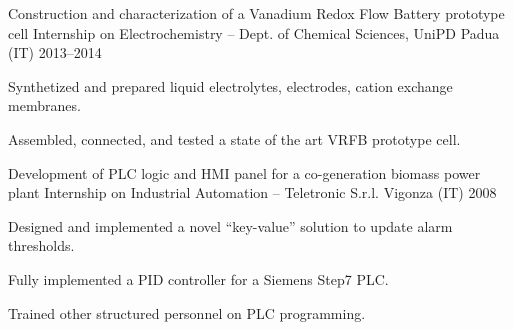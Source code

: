 \begin{cventries}
    \cventry%
        {Construction and characterization of a Vanadium Redox Flow Battery prototype cell}
        {Internship on Electrochemistry -- Dept. of Chemical Sciences, UniPD}
        {Padua (IT)}
        {2013--2014}
        {\begin{cvitems}
            \item Synthetized and prepared liquid electrolytes, electrodes, cation exchange membranes.
            \item Assembled, connected, and tested a state of the art VRFB prototype cell.
        \end{cvitems}}

    \cventry%
        {Development of PLC logic and HMI panel for a co-generation biomass power plant}
        {Internship on Industrial Automation -- Teletronic S.r.l.}
        {Vigonza (IT)}
        {2008}
        {\begin{cvitems}
            \item Designed and implemented a novel ``key-value'' solution to update alarm thresholds.
            \item Fully implemented a PID controller for a Siemens Step7 PLC.
            \item Trained other structured personnel on PLC programming.
        \end{cvitems}}

\end{cventries}
